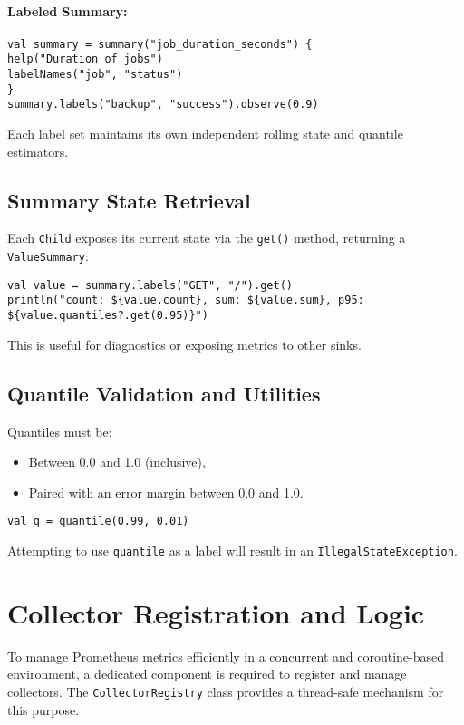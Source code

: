 \paragraph{Labeled Summary:}
\begin{verbatim}
val summary = summary("job_duration_seconds") {
help("Duration of jobs")
labelNames("job", "status")
}
summary.labels("backup", "success").observe(0.9)
\end{verbatim}

Each label set maintains its own independent rolling state and quantile estimators.

\subsection{Summary State Retrieval}

Each \texttt{Child} exposes its current state via the \texttt{get()} method, returning a \texttt{ValueSummary}:

\begin{verbatim}
val value = summary.labels("GET", "/").get()
println("count: ${value.count}, sum: ${value.sum}, p95: ${value.quantiles?.get(0.95)}")
\end{verbatim}

This is useful for diagnostics or exposing metrics to other sinks.

\subsection{Quantile Validation and Utilities}

Quantiles must be:
\begin{itemize}
\item Between 0.0 and 1.0 (inclusive),
\item Paired with an error margin between 0.0 and 1.0.
\end{itemize}

\begin{verbatim}
val q = quantile(0.99, 0.01)
\end{verbatim}

Attempting to use \texttt{quantile} as a label will result in an \texttt{IllegalStateException}.


\section{Collector Registration and Logic}

To manage Prometheus metrics efficiently in a concurrent and coroutine-based environment, a dedicated component is required to register and manage collectors. The \texttt{CollectorRegistry} class provides a thread-safe mechanism for this purpose.

